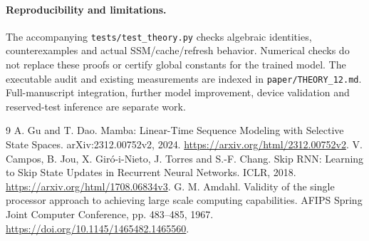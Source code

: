 \documentclass[11pt]{article}
\begin{document}
\paragraph{Reproducibility and limitations.}
The accompanying \texttt{tests/test\_theory.py} checks algebraic identities,
counterexamples and actual SSM/cache/refresh behavior. Numerical checks do
not replace these proofs or certify global constants for the trained model.
The executable audit and existing measurements are indexed in
\texttt{paper/THEORY\_12.md}. Full-manuscript integration, further model
improvement, device validation and reserved-test inference are separate work.

\begin{thebibliography}{9}
 A. Gu and T. Dao.
Mamba: Linear-Time Sequence Modeling with Selective State Spaces.
arXiv:2312.00752v2, 2024.
\url{https://arxiv.org/html/2312.00752v2}.
 V. Campos, B. Jou, X. Gir\'o-i-Nieto, J. Torres and S.-F. Chang.
Skip RNN: Learning to Skip State Updates in Recurrent Neural Networks.
ICLR, 2018. \url{https://arxiv.org/html/1708.06834v3}.
 G. M. Amdahl.
Validity of the single processor approach to achieving large scale computing capabilities.
AFIPS Spring Joint Computer Conference, pp. 483--485, 1967.
\url{https://doi.org/10.1145/1465482.1465560}.
\end{thebibliography}
\end{document}
